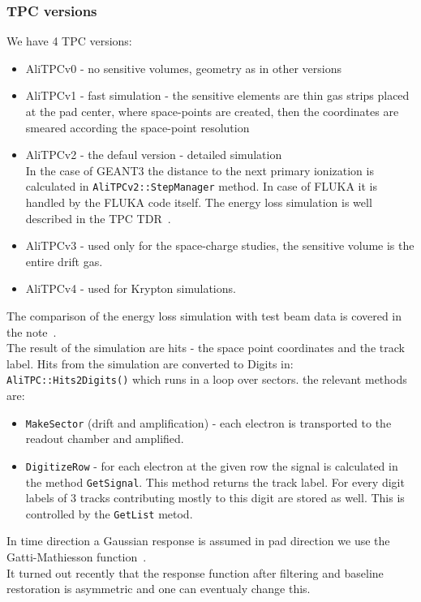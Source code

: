 \documentclass[a4paper,12pt]{article}
\begin{document}
\subsubsection{TPC versions}
We have 4 TPC versions:
\begin{itemize}
\item AliTPCv0 - no sensitive volumes, geometry as in other versions
\item AliTPCv1 - fast simulation - the sensitive elements are thin gas strips
placed at the pad center, where space-points are created, then the coordinates 
are smeared according the space-point resolution
\item AliTPCv2 - the defaul version - detailed simulation \\
In the case of GEANT3 the distance to the next primary ionization is calculated
in \texttt{AliTPCv2::StepManager} method. In case of FLUKA it is handled by 
the FLUKA code itself.
The energy loss simulation is well
described in the TPC TDR~\cite{tpctdr}.
\item AliTPCv3 - used only for the space-charge studies, the sensitive volume 
is the entire drift gas.
\item AliTPCv4 - used for Krypton simulations.
\end{itemize}
The comparison of the energy loss simulation with test beam data is
covered in the note~\cite{tpctune}.\\
The result of the simulation are hits - the space point coordinates and the 
track label.
Hits from the simulation are converted to Digits in: \\
\texttt{AliTPC::Hits2Digits()} which runs in a loop over sectors.
the relevant methods are:
\begin{itemize}
\item \texttt{MakeSector} (drift and amplification) - each electron is 
transported 
to the readout chamber and amplified.
\item \texttt{DigitizeRow} - for each electron at the given row the signal is 
calculated in the method \texttt{GetSignal}. This method returns the track 
label. For every digit labels of 3 tracks contributing mostly to this
digit are stored as well. This is controlled by the \texttt{GetList}
metod.
\end{itemize}
In time direction  a Gaussian response is assumed in pad direction we use 
the Gatti-Mathiesson function~\cite{math}.\\
It turned out recently that the
response function after filtering and baseline restoration is
asymmetric and one can eventualy change this.
\end{document}

